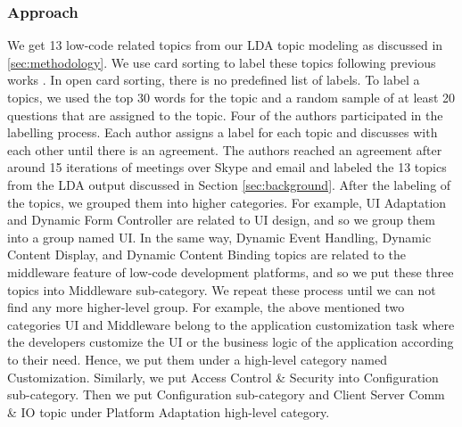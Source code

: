 \subsubsection{Approach}
We get 13 low-code related topics from our LDA topic modeling as discussed in \sec\ref{sec:methodology}. We use card sorting \cite{fincher2005making} to label these topics  following previous
works \cite{bagherzadeh2019going, ahmed2018concurrency, yang2016security, rosen2016mobile, abdellatif2020challenges}.
In open card sorting, there is no predefined list of labels. To label a topics, 
we used the top 30 words for the topic and a random sample of at least 20 questions that are assigned to the topic. Four of the authors participated in the labelling process.
Each author assigns a label for each topic and discusses with each other until
there is an agreement. The authors reached an agreement after around 15
iterations of meetings over Skype and email and labeled the 13 topics from the
LDA output discussed in Section \ref{sec:background}. After the labeling of the topics, we grouped them into higher categories. For
example, UI Adaptation and Dynamic Form Controller are related to UI design, and
so we group them into a group named UI. In the same way, Dynamic Event Handling,
Dynamic Content Display, and Dynamic Content Binding topics are related to the
middleware feature of low-code development platforms, and so we put these three
topics into Middleware sub-category. We repeat these process until we can not
find any more higher-level group. For example, the above mentioned two
categories UI and Middleware belong to the application customization task where
the developers customize the UI or the business logic of the application
according to their need. Hence, we put them under a high-level category named
Customization. Similarly, we put Access Control \& Security into Configuration sub-category. Then we put Configuration sub-category and Client Server Comm \& IO topic under Platform Adaptation high-level category.



